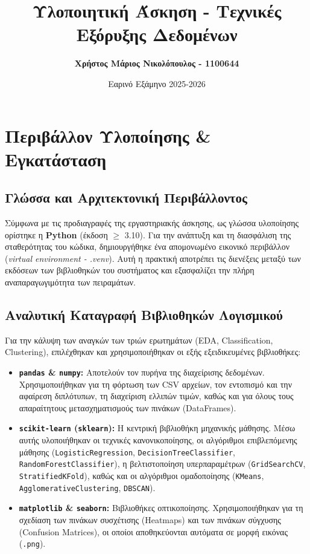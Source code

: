 \documentclass[11pt,a4paper]{article}
\title{\textbf{Υλοποιητική Άσκηση - Τεχνικές Εξόρυξης Δεδομένων}}
\author{\textbf{Χρήστος Μάριος Νικολόπουλος - 1100644}}
\date{Εαρινό Εξάμηνο 2025-2026}
\begin{document}
	
	\maketitle
	\newpage
	\tableofcontents
	\newpage
	
	\section{Περιβάλλον Υλοποίησης \& Εγκατάσταση}
	
	\subsection{Γλώσσα και Αρχιτεκτονική Περιβάλλοντος}
	Σύμφωνα με τις προδιαγραφές της εργαστηριακής άσκησης, ως γλώσσα υλοποίησης ορίστηκε η \textbf{Python} (έκδοση $\ge$ 3.10). Για την ανάπτυξη και τη διασφάλιση της σταθερότητας του κώδικα, δημιουργήθηκε ένα απομονωμένο εικονικό περιβάλλον (\textit{virtual environment - .venv}). Αυτή η πρακτική αποτρέπει τις διενέξεις μεταξύ των εκδόσεων των βιβλιοθηκών του συστήματος και εξασφαλίζει την πλήρη αναπαραγωγιμότητα των πειραμάτων.
	
	\subsection{Αναλυτική Καταγραφή Βιβλιοθηκών Λογισμικού}
	Για την κάλυψη των αναγκών των τριών ερωτημάτων (EDA, Classification, Clustering), επιλέχθηκαν και χρησιμοποιήθηκαν οι εξής εξειδικευμένες βιβλιοθήκες:
	
	\begin{itemize}
		\item \textbf{\texttt{pandas} \& \texttt{numpy}:} Αποτελούν τον πυρήνα της διαχείρισης δεδομένων. Χρησιμοποιήθηκαν για τη φόρτωση των CSV αρχείων, τον εντοπισμό και την αφαίρεση διπλότυπων, τη διαχείριση ελλιπών τιμών, καθώς και για όλους τους απαραίτητους μετασχηματισμούς των πινάκων (DataFrames).
		\item \textbf{\texttt{scikit-learn} (\texttt{sklearn}):} Η κεντρική βιβλιοθήκη μηχανικής μάθησης. Μέσω αυτής υλοποιήθηκαν οι τεχνικές κανονικοποίησης, οι αλγόριθμοι επιβλεπόμενης μάθησης (\texttt{LogisticRegression}, \texttt{DecisionTreeClassifier}, \texttt{RandomForestClassifier}), η βελτιστοποίηση υπερπαραμέτρων (\texttt{GridSearchCV}, \texttt{StratifiedKFold}), καθώς και οι αλγόριθμοι ομαδοποίησης (\texttt{KMeans}, \texttt{AgglomerativeClustering}, \texttt{DBSCAN}).
		\item \textbf{\texttt{matplotlib} \& \texttt{seaborn}:} Βιβλιοθήκες οπτικοποίησης. Χρησιμοποιήθηκαν για τη σχεδίαση των πινάκων συσχέτισης (Heatmaps) και των πινάκων σύγχυσης (Confusion Matrices), οι οποίοι αποθηκεύονται αυτόματα σε μορφή εικόνας (\texttt{.png}).
	\end{itemize}
	
\end{document}
